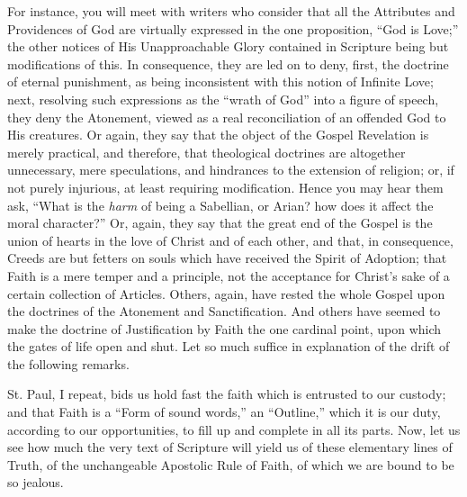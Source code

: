 For instance, you will meet with writers who consider that all the
Attributes and Providences of God are virtually expressed in the one
proposition, ``God is Love;'' the other notices of His
Unapproachable Glory contained in Scripture being but modifications of
this. In consequence, they are led on to deny, first, the doctrine of
eternal punishment, as being inconsistent with this notion of Infinite
Love; next, resolving such expressions as the ``wrath of God''
into a figure of speech, they deny the Atonement, viewed as a real
reconciliation of an offended God to His creatures. Or again, they say
that the object of the Gospel Revelation is merely practical, and
therefore, that theological doctrines are altogether unnecessary, mere
speculations, and hindrances to the extension of religion; or, if not
purely injurious, at least requiring modification. Hence you may hear
them ask, ``What is the \emph{harm} of being a Sabellian, or Arian?
how does it affect the moral character?'' Or, again, they say that
the great end of the Gospel is the union of hearts in the love of Christ
and of each other, and that, in consequence, Creeds are but fetters on
souls which have received the Spirit of Adoption; that Faith is a mere
temper and a principle, not the acceptance for Christ's sake of a
certain collection of Articles. Others, again, have rested the whole
Gospel upon the doctrines of the Atonement and Sanctification. And
others have seemed to make the doctrine of Justification by Faith the
one cardinal point, upon which the gates of life open and shut. Let so
much suffice in explanation of the drift of the following remarks.

St. Paul, I repeat, bids us hold fast the faith which is entrusted to
our custody; and that Faith is a ``Form of sound words,'' an
``Outline,'' which it is our duty, according to our
opportunities, to fill up and complete in all its parts. Now, let us see
how much the very text of Scripture will yield us of these elementary
lines of Truth, of the unchangeable Apostolic
Rule of Faith, of which we are bound to be so jealous.

